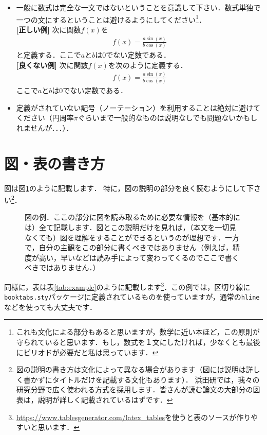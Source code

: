 \documentclass[dvipdfmx,autodetect-engine]{jsreport}
\begin{document}
\begin{itemize}
\item 一般に数式は完全な一文ではないということを意識して下さい．数式単独で一つの文にするということは避けるようにしてください\footnote{これも文化による部分もあると思いますが，数学に近い本ほど，この原則が守られていると思います．もし，数式を１文にしたければ，少なくとも最後にピリオドが必要だと私は思っています．}．\\
%
\textbf{[正しい例] }
次に関数$f(x)$を
\begin{align*}
f(x) = \frac{a \sin(x)}{b \cos(x)}
\end{align*}
と定義する．ここで$a$と$b$は0でない定数である．\\
\textbf{[良くない例] }
次に関数$f(x)$を次のように定義する．
\begin{align*}
f(x) = \frac{a \sin(x)}{b \cos(x)}
\end{align*}
ここで$a$と$b$は0でない定数である．
\item 定義がされていない記号（ノーテーション）を利用することは絶対に避けてください（円周率$\pi$ぐらいまで一般的なものは説明なしでも問題ないかもしれませんが．．．）．
\end{itemize}

\section{図・表の書き方}

図は図\ref{fig:example}のように記載します．
特に，図の説明の部分を良く読むようにして下さい\footnote{図の説明の書き方は文化によって異なる場合があります（図には説明は詳しく書かずにタイトルだけを記載する文化もあります）．
浜田研では，我々の研究分野で広く使われる方式を採用します．皆さんが読む論文の大部分の図表は，説明が詳しく記載されているはずです．}．

\begin{figure}[h]
\vspace{50mm}
\caption{\label{fig:example}
図の例．ここの部分に図を読み取るために必要な情報を（基本的には）全て記載します．図とこの説明だけを見れば，（本文を一切見なくても）図を理解をすることができるというのが理想です．一方で，自分の主観をこの部分に書くべきではありません（例えば，精度が高い，早いなどは読み手によって変わってくるのでここで書くべきではありません．）
}
\end{figure}

同様に，表は表\ref{tab:example}のように記載します\footnote{\url{https://www.tablesgenerator.com/latex_tables}を使うと表のソースが作りやすいと思います．}．この例では，区切り線に\texttt{booktabs.sty}パッケージに定義されているものを使っていますが，通常の\texttt{hline}などを使っても大丈夫です．
\end{document}
